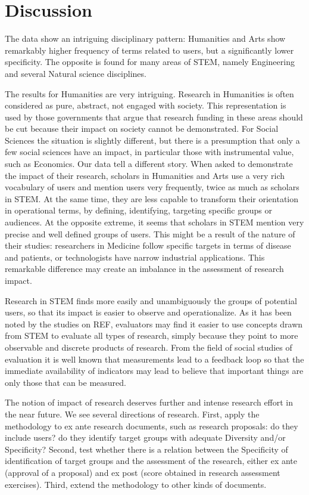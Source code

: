 \documentclass[]{book}
\theoremstyle{definition}
\theoremstyle{definition}
\theoremstyle{definition}
\theoremstyle{remark}
\begin{document}
\section{Discussion}\label{discussion-1}

The data show an intriguing disciplinary pattern: Humanities and Arts
show remarkably higher frequency of terms related to users, but a
significantly lower specificity. The opposite is found for many areas of
STEM, namely Engineering and several Natural science disciplines.

The results for Humanities are very intriguing. Research in Humanities
is often considered as pure, abstract, not engaged with society. This
representation is used by those governments that argue that research
funding in these areas should be cut because their impact on society
cannot be demonstrated. For Social Sciences the situation is slightly
different, but there is a presumption that only a few social sciences
have an impact, in particular those with instrumental value, such as
Economics. Our data tell a different story. When asked to demonstrate
the impact of their research, scholars in Humanities and Arts use a very
rich vocabulary of users and mention users very frequently, twice as
much as scholars in STEM. At the same time, they are less capable to
transform their orientation in operational terms, by defining,
identifying, targeting specific groups or audiences. At the opposite
extreme, it seems that scholars in STEM mention very precise and well
defined groups of users. This might be a result of the nature of their
studies: researchers in Medicine follow specific targets in terms of
disease and patients, or technologists have narrow industrial
applications. This remarkable difference may create an imbalance in the
assessment of research impact.

Research in STEM finds more easily and unambiguously the groups of
potential users, so that its impact is easier to observe and
operationalize. As it has been noted by the studies on REF, evaluators
may find it easier to use concepts drawn from STEM to evaluate all types
of research, simply because they point to more observable and discrete
products of research. From the field of social studies of evaluation it
is well known that measurements lead to a feedback loop so that the
immediate availability of indicators may lead to believe that important
things are only those that can be measured.

The notion of impact of research deserves further and intense research
effort in the near future. We see several directions of research. First,
apply the methodology to ex ante research documents, such as research
proposals: do they include users? do they identify target groups with
adequate Diversity and/or Specificity? Second, test whether there is a
relation between the Specificity of identification of target groups and
the assessment of the research, either ex ante (approval of a proposal)
and ex post (score obtained in research assessment exercises). Third,
extend the methodology to other kinds of documents.
\end{document}
